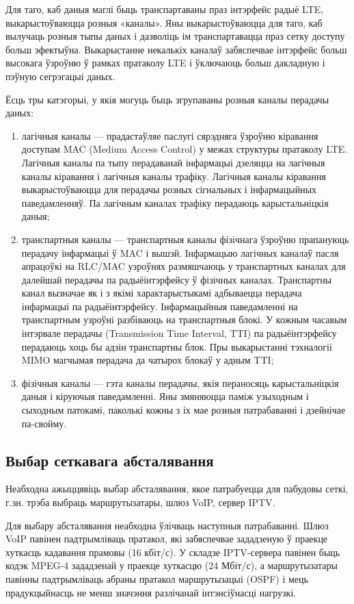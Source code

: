 Для таго, каб даныя маглі быць транспартаваны праз інтэрфейс радыё LTE, выкарыстоўваюцца розныя «каналы». Яны выкарыстоўваюцца для таго, каб вылучаць розныя тыпы даных і дазволіць ім транспартавацца праз сетку доступу больш эфектыўна. Выкарыстанне некалькіх каналаў забяспечвае інтэрфейс больш высокага ўзроўню ў рамках пратаколу LTE і ўключаюць больш дакладную і пэўную сегрэгацыі даных.

Ёсць тры катэгорыі, у якія могуць быць згрупаваны розныя каналы перадачы даных:
\begin{enumerate}
    \item лагічныя каналы --- прадастаўляе паслугі сярэдняга ўзроўню кіравання доступам MAC (Medium Access Control) у межах структуры пратаколу LTE. Лагічныя каналы па тыпу перадаванай інфармацыі дзеляцца на лагічныя каналы кіравання і лагічныя каналы трафіку. Лагічныя каналы кіравання выкарыстоўваюцца для перадачы розных сігнальных і інфармацыйных паведамленняў. Па лагічным каналах трафіку перадаюць карыстальніцкія даныя;
    \item транспартныя каналы --- транспартныя каналы фізічнага ўзроўню прапануюць перадачу інфармацыі ў MAC і вышэй. Інфармацыю лагічных каналаў пасля апрацоўкі на RLC/MAC узроўнях размяшчаюць у транспартных каналах для далейшай перадачы па радыёінтэрфейсу ў фізічных каналах. Транспартны канал вызначае як і з якімі характарыстыкамі адбываецца перадача інфармацыі па радыёінтэрфейсу. Інфармацыйныя паведамленні на транспартным узроўні разбіваюць на транспартныя блокі. У кожным часавым інтэрвале перадачы (Transmission Time Interval, TTI) па радыёінтэрфейсу перадаюць хоць бы адзін транспартны блок. Пры выкарыстанні тэхналогіі MIMO магчымая перадача да чатырох блокаў у адным TTI;
    \item фізічныя каналы --- гэта каналы перадачы, якія пераносяць карыстальніцкія даныя і кіруючыя паведамленні. Яны змяняюцца паміж узыходным і сыходным патокамі, паколькі кожны з іх мае розныя патрабаванні і дзейнічае па-свойму.
\end{enumerate}

\subsection{Выбар сеткавага абсталявання}

Неабходна ажыццявіць выбар абсталявання, якое патрабуецца для пабудовы сеткі, г.зн. трэба выбраць маршрутызатары, шлюз VoIP, сервер IPTV.

Для выбару абсталявання неабходна ўлічваць наступныя патрабаванні. Шлюз VoIP павінен падтрымліваць пратакол, які забяспечвае зададзеную ў праекце хуткасць кадавання прамовы (16 кбіт/с). У складзе IPTV-сервера павінен быць кодэк MPEG-4 зададзенай у праекце хуткасцю (24 Мбіт/с), а маршрутызатары павінны падтрымліваць абраны пратакол маршрутызацыі (OSPF) і мець прадукцыйнасць не менш значэння разлічанай інтэнсіўнасці нагрузкі.

